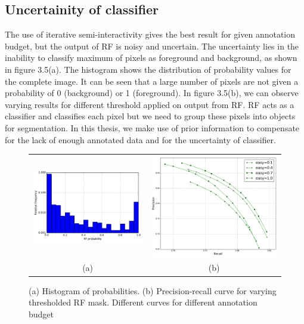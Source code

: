 \subsection{Uncertainity of classifier}
The use of iterative semi-interactivity gives the best result for given annotation budget, but the output of RF is noisy and uncertain. The uncertainty lies in the inability to classify maximum of pixels as foreground and background, as shown in figure 3.5(a). The histogram shows the distribution of probability values for the complete image. It can be seen that a large number of pixels are not given a probability of 0 (background) or 1 (foreground). In figure 3.5(b), we can observe varying results for different threshold applied on output from RF. RF acts as a classifier and classifies each pixel but we need to group these pixels into objects for segmentation. In this thesis, we make use of prior information to compensate for the lack of enough annotated data and for the uncertainty of classifier.

\begin{figure}[h!] \label{fig:uncertain}
\begin{tabular}{cc}
 \includegraphics[width=0.5\linewidth]{figures/hist.pdf} & \includegraphics[width=0.5\linewidth]{figures/pr_curve.pdf} \\
  (a)  & (b) \\
\end{tabular}
\caption{(a) Histogram of probabilities. (b) Precision-recall curve for varying thresholded RF mask. Different curves for different annotation budget}
\end{figure}

